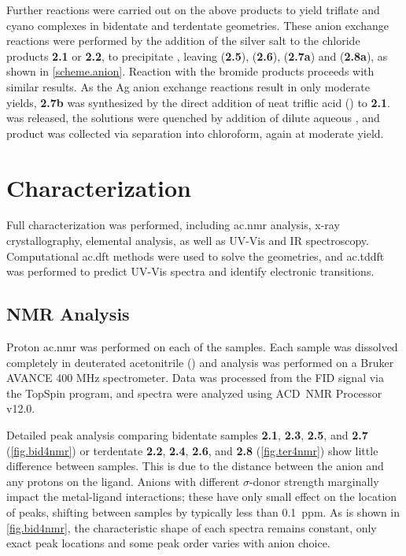 Further reactions were carried out on the above products to yield triflate and cyano complexes in bidentate and terdentate geometries. These anion exchange reactions were performed by the addition of the silver salt to the chloride products \textbf{2.1} or \textbf{2.2}, to precipitate , leaving  (\textbf{2.5}),  (\textbf{2.6}),  (\textbf{2.7a}) and  (\textbf{2.8a}), as shown in \autoref{scheme.anion}. Reaction with the bromide products proceeds with similar results. As the Ag anion exchange reactions result in only moderate yields, \textbf{2.7b} was synthesized by the direct addition of neat triflic acid () to \textbf{2.1}.  was released, the solutions were quenched by addition of dilute aqueous , and product was collected via separation into chloroform, again at moderate yield. 

\section{Characterization}

Full characterization was performed, including \Gls{ac.nmr} analysis, x-ray crystallography, elemental analysis, as well as UV-Vis and IR spectroscopy. Computational \gls{ac.dft} methods were used to solve the geometries, and \gls{ac.tddft} was performed to predict UV-Vis spectra and identify electronic transitions. 

\subsection{NMR Analysis}

Proton \gls{ac.nmr} was performed on each of the samples. Each sample was dissolved completely in deuterated acetonitrile () and analysis was performed on a Bruker AVANCE 400 MHz spectrometer. Data was processed from the FID signal via the TopSpin program, and spectra were analyzed using ACD~NMR Processor v12.0. 

Detailed peak analysis comparing bidentate samples \textbf{2.1}, \textbf{2.3}, \textbf{2.5}, and \textbf{2.7} (\autoref{fig.bid4nmr}) or terdentate \textbf{2.2}, \textbf{2.4}, \textbf{2.6}, and \textbf{2.8} (\autoref{fig.ter4nmr}) show little difference between samples. This is due to the distance between the anion and any protons on the ligand. Anions with different $\sigma$-donor strength marginally impact the metal-ligand interactions; these have only small effect on the location of peaks, shifting between samples by typically less than 0.1~ppm. As is shown in \autoref{fig.bid4nmr}, the characteristic shape of each spectra remains constant, only exact peak locations and some peak order varies with anion choice. 


